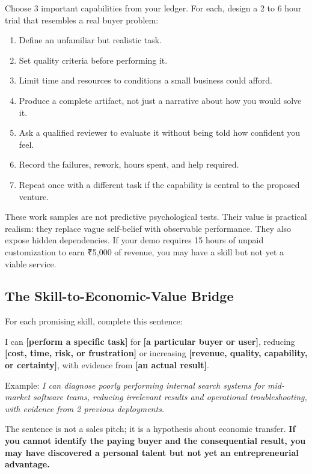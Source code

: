 Choose 3 important capabilities from your ledger. For each, design a 2 to 6 hour trial that resembles a real buyer problem:

\begin{enumerate}[label=\textbf{\arabic*.},leftmargin=11pt,itemsep=1.5pt,topsep=1.5pt,parsep=0pt]
  \item Define an unfamiliar but realistic task.
  \item Set quality criteria before performing it.
  \item Limit time and resources to conditions a small business could afford.
  \item Produce a complete artifact, not just a narrative about how you would solve it.
  \item Ask a qualified reviewer to evaluate it without being told how confident you feel.
  \item Record the failures, rework, hours spent, and help required.
  \item Repeat once with a different task if the capability is central to the proposed venture.
\end{enumerate}

These work samples are not predictive psychological tests. Their value is practical realism: they replace vague self-belief with observable performance. They also expose hidden dependencies. If your demo requires 15 hours of unpaid customization to earn ₹5,000 of revenue, you may have a skill but not yet a viable service.

\subsection{The Skill-to-Economic-Value Bridge}

For each promising skill, complete this sentence:

\begin{tcolorbox}[
  enhanced,
  colback=BayesPale!25!white,
  colframe=BayesBorder!60!white,
  boxrule=0.4pt,
  arc=2pt,
  left=6pt,right=6pt,top=4pt,bottom=4pt,
  before skip=3pt,after skip=4pt
]
\footnotesize\color{BayesInk}
I can \textbf{[perform a specific task]} for \textbf{[a particular buyer or user]}, reducing \textbf{[cost, time, risk, or frustration]} or increasing \textbf{[revenue, quality, capability, or certainty]}, with evidence from \textbf{[an actual result]}.
\end{tcolorbox}

Example: \textit{I can diagnose poorly performing internal search systems for mid-market software teams, reducing irrelevant results and operational troubleshooting, with evidence from 2 previous deployments.}

The sentence is not a sales pitch; it is a hypothesis about economic transfer. \textbf{If you cannot identify the paying buyer and the consequential result, you may have discovered a personal talent but not yet an entrepreneurial advantage.}
